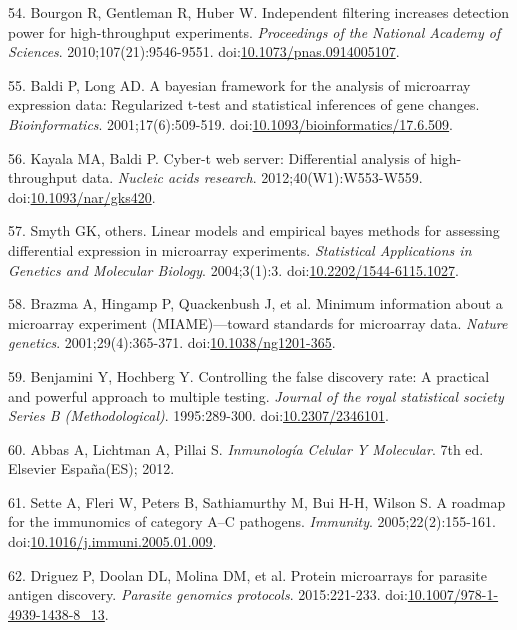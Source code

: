 \documentclass[a4paper]{article}
\begin{document}
\hypertarget{ref-bourgon2010filter}{}
54. Bourgon R, Gentleman R, Huber W. Independent filtering increases
detection power for high-throughput experiments. \emph{Proceedings of
the National Academy of Sciences}. 2010;107(21):9546-9551.
doi:\href{https://doi.org/10.1073/pnas.0914005107}{10.1073/pnas.0914005107}.

\hypertarget{ref-baldi2001cybert}{}
55. Baldi P, Long AD. A bayesian framework for the analysis of
microarray expression data: Regularized t-test and statistical
inferences of gene changes. \emph{Bioinformatics}. 2001;17(6):509-519.
doi:\href{https://doi.org/10.1093/bioinformatics/17.6.509}{10.1093/bioinformatics/17.6.509}.

\hypertarget{ref-kayala2012cyber}{}
56. Kayala MA, Baldi P. Cyber-t web server: Differential analysis of
high-throughput data. \emph{Nucleic acids research}.
2012;40(W1):W553-W559.
doi:\href{https://doi.org/10.1093/nar/gks420}{10.1093/nar/gks420}.

\hypertarget{ref-smyth2004ebayes}{}
57. Smyth GK, others. Linear models and empirical bayes methods for
assessing differential expression in microarray experiments.
\emph{Statistical Applications in Genetics and Molecular Biology}.
2004;3(1):3.
doi:\href{https://doi.org/10.2202/1544-6115.1027}{10.2202/1544-6115.1027}.

\hypertarget{ref-brazma2001}{}
58. Brazma A, Hingamp P, Quackenbush J, et al. Minimum information about
a microarray experiment (MIAME)---toward standards for microarray data.
\emph{Nature genetics}. 2001;29(4):365-371.
doi:\href{https://doi.org/10.1038/ng1201-365}{10.1038/ng1201-365}.

\hypertarget{ref-benjamini1995fdr}{}
59. Benjamini Y, Hochberg Y. Controlling the false discovery rate: A
practical and powerful approach to multiple testing. \emph{Journal of
the royal statistical society Series B (Methodological)}. 1995:289-300.
doi:\href{https://doi.org/10.2307/2346101}{10.2307/2346101}.

\hypertarget{ref-abbas2012}{}
60. Abbas A, Lichtman A, Pillai S. \emph{Inmunología Celular Y
Molecular}. 7th ed. Elsevier España(ES); 2012.

\hypertarget{ref-sette2005}{}
61. Sette A, Fleri W, Peters B, Sathiamurthy M, Bui H-H, Wilson S. A
roadmap for the immunomics of category A--C pathogens. \emph{Immunity}.
2005;22(2):155-161.
doi:\href{https://doi.org/10.1016/j.immuni.2005.01.009}{10.1016/j.immuni.2005.01.009}.

\hypertarget{ref-Driguez2015}{}
62. Driguez P, Doolan DL, Molina DM, et al. Protein microarrays for
parasite antigen discovery. \emph{Parasite genomics protocols}.
2015:221-233.
doi:\href{https://doi.org/10.1007/978-1-4939-1438-8_13}{10.1007/978-1-4939-1438-8\_13}.
\end{document}
